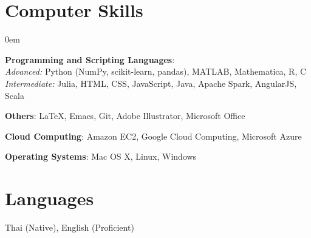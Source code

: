\section{\sc Computer Skills}

\begin{itemize}[leftmargin=0cm, label={}]{
\itemsep0em
\item {\bf Programming and Scripting Languages}:\\
\textit{Advanced:} Python (\textsf{NumPy, scikit-learn, pandas}), MATLAB,  Mathematica, \textsf{R}, \textsf{C}\\
\textit{Intermediate:} \textsf{Julia}, \textsf{HTML}, \textsf{CSS}, \textsf{JavaScript}, \textsf{Java}, Apache Spark, AngularJS, Scala
\item {\bf Others}: \LaTeX, \textsf{Emacs}, \textsf{Git}, Adobe Illustrator, Microsoft Office
\item {\bf Cloud Computing}: Amazon EC2, Google Cloud Computing, Microsoft Azure
\item {\bf Operating Systems}: Mac OS X, Linux, Windows}

\end{itemize}

\section{\sc Languages}
Thai (Native), English (Proficient)
